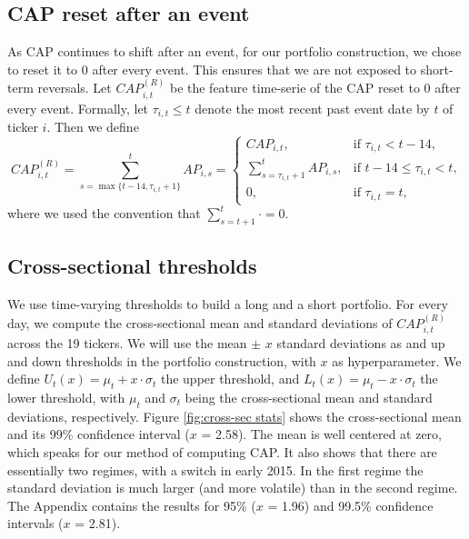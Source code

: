 

\subsection{CAP reset after an event}

As CAP continues to shift after an event, for our portfolio construction, we chose to reset it to 0 after every event. This ensures that we are not exposed to short-term reversals. Let $CAP_{i,t}^{(R)}$ be the feature time-serie of the CAP reset to 0 after every event. Formally, let $\tau_{i,t}\le t$ denote the most recent past event date by $t$ of ticker $i$. Then we define
\[ CAP_{i,t}^{(R)} = \sum_{s=\max\{t-14,\tau_{i,t}+1\}}^t AP_{i,s} = \begin{cases} CAP_{i,t},&\text{if $\tau_{i,t}<t-14$,} \\ \sum_{s= \tau_{i,t}+1}^t AP_{i,s},&\text{if $t-14\le \tau_{i,t}<t$,}\\
0,&\text{if $\tau_{i,t}=t$,}\end{cases}\]
where we used the convention that $\sum_{s=t+1}^t \cdot =0$.

\subsection{Cross-sectional thresholds}

We use time-varying thresholds to build a long and a short portfolio. For every day, we compute the cross-sectional mean and standard deviations of  $CAP_{i,t}^{(R)}$ across the 19 tickers. We will use the mean $\pm$ $x$ standard deviations as and up and down thresholds in the portfolio construction, with $x$ as hyperparameter. We define $U_t(x) = \mu_t + x \cdot \sigma_t$ the upper threshold, and $L_t(x) = \mu_t - x \cdot \sigma_t$ the lower threshold, with $\mu_t$ and $\sigma_t$ being the cross-sectional mean and standard deviations, respectively.  Figure \ref{fig:cross-sec stats} shows the cross-sectional mean and its 99\% confidence interval ($x$ = 2.58). The mean is well centered at zero, which speaks for our method of computing CAP. It also shows that there are essentially two regimes, with a switch in early 2015. In the first regime the standard deviation is much larger (and more volatile) than in the second regime. The Appendix contains the results for 95\% ($x$ = 1.96) and 99.5\% confidence intervals ($x$ = 2.81). 

